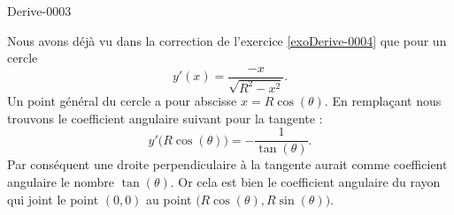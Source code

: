 
\begin{corrige}{Derive-0003}

	Nous avons déjà vu dans la correction de l'exercice \ref{exoDerive-0004} que pour un cercle
	\begin{equation}
		y'(x)=\frac{ -x }{ \sqrt{R^2-x^2} }.
	\end{equation}
	Un point général du cercle a pour abscisse $x=R\cos(\theta)$. En remplaçant nous trouvons le coefficient angulaire suivant pour la tangente :
	\begin{equation}
		y'\big( R\cos(\theta) \big)=-\frac{1}{ \tan(\theta) }.
	\end{equation}
	Par conséquent une droite perpendiculaire à la tangente aurait comme coefficient angulaire le nombre $\tan(\theta)$. Or cela est bien le coefficient angulaire du rayon qui joint le point $(0,0)$ au point $\big( R\cos(\theta),R\sin(\theta) \big)$.

\end{corrige}
